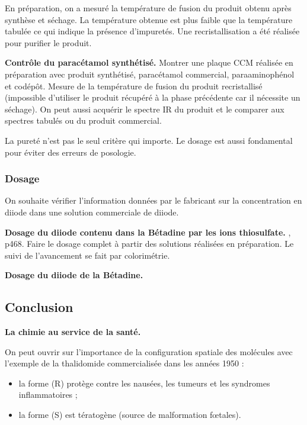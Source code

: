 En préparation, on a mesuré la température de fusion du produit obtenu après synthèse et séchage.
La température obtenue est plus faible que la température tabulée ce qui indique la présence d'impuretés.
Une recristallisation a été réalisée pour purifier le produit.

\begin{experience}
\textbf{Contrôle du paracétamol synthétisé.}
Montrer une plaque CCM réalisée en préparation avec produit synthétisé, paracétamol commercial, paraaminophénol et codépôt.
Mesure de la température de fusion du produit recristallisé (impossible d'utiliser le produit récupéré à la phase précédente car il nécessite un séchage).
On peut aussi acquérir le spectre IR du produit et le comparer aux spectres tabulés ou du produit commercial.
\end{experience}

\begin{transition}
La pureté n'est pas le seul critère qui importe.
Le dosage est aussi fondamental pour éviter des erreurs de posologie.
\end{transition}

\subsubsection{Dosage}

On souhaite vérifier l'information données par le fabricant sur la concentration en diiode dans une solution commerciale de diiode.

\begin{experience}
\textbf{Dosage du diiode contenu dans la Bétadine par les ions thiosulfate.}
\cite{Dulaurans2012}, p468.
Faire le dosage complet à partir des solutions réalisées en préparation.
Le suivi de l'avancement se fait par colorimétrie.
\end{experience}

\begin{slide}
\textbf{Dosage du diiode de la Bétadine.}
\end{slide}


\subsection{Conclusion}

\begin{slide}
\textbf{La chimie au service de la santé.}
\end{slide}

On peut ouvrir sur l'importance de la configuration spatiale des molécules avec l'exemple de la thalidomide commercialisée dans les années 1950 :
\begin{itemize}
\item la forme (R) protège contre les nausées, les tumeurs et les syndromes inflammatoires ;
\item la forme (S) est tératogène (source de malformation fœtales).
\end{itemize}

\newpage